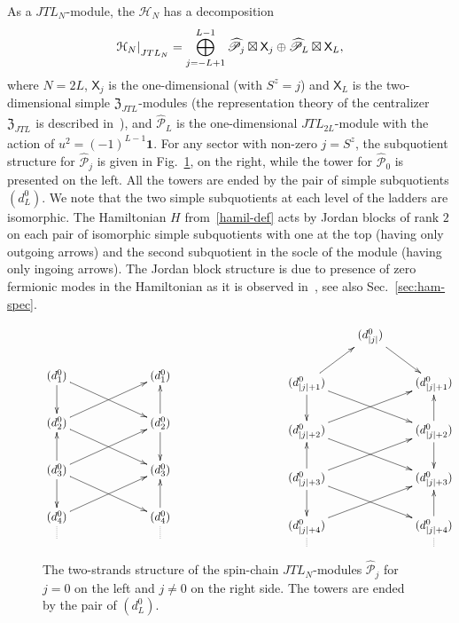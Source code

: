 \documentclass[11pt]{article}
\newcommand{\one}{\boldsymbol{1}}%
\newcommand{\JTL}[1]{JTL_{#1}}
\newcommand{\Hilb}{\mathcal{H}}
\newcommand{\cent}{\mathfrak{Z}}
\newcommand{\centJTL}{\cent_{\JTL{}}}
\newcommand{\Xodd}[1]{\mathsf{X}_{#1}}
\newcommand{\TLX}{d^0}
\newcommand{\APrTL}[1]{\widehat{\mathscr{P}}_{#1}}
\theoremstyle{definition}
\begin{document}
As a $\JTL{N}$-module, the $\Hilb_{N}$ has a decomposition
\begin{equation}\label{decomp-JTL}
\Hilb_N|_{\rule{0pt}{7.5pt}%
\JTL{N}} =  \bigoplus_{j=-L+1}^{L-1} \APrTL{j}\boxtimes\Xodd{j} \oplus
\APrTL{L}\boxtimes\Xodd{L},
\end{equation}
where $N=2L$, $\Xodd{j}$ is the one-dimensional (with $S^z=j$) and  $\Xodd{L}$ is the two-dimensional simple
$\centJTL$-modules (the representation theory of the centralizer $\centJTL$ is described
 in~\cite[Sec.~3]{GRS2}), and
 $\APrTL{L}$ is the one-dimensional $\JTL{2L}$-module with the action of $u^2=(-1)^{L-1}\one$.
 For any sector with non-zero  $j=S^z$,
the subquotient structure for $\APrTL{j}$ is given in
Fig.~\ref{FF-JTL-mod}, on the right, while the tower for $\APrTL{0}$
is presented on the left.  All the towers are ended by the pair of
simple subquotients $(\TLX_L)$.  We note that the
two simple subquotients at each level of the ladders are
isomorphic. The Hamiltonian $H$ from~\eqref{hamil-def} acts by Jordan
blocks of rank $2$ on each pair of isomorphic simple subquotients
with one at the top (having only outgoing arrows) and the second
subquotient in the socle of
the module (having only ingoing arrows). The Jordan block structure is due to presence of zero
fermionic modes in the Hamiltonian as it is observed in~\cite{GRS1},
see also Sec.~\ref{sec:ham-spec}.
 \begin{figure}\centering
\begin{equation*}
  \xymatrix@R=24pt@C=30pt{
    &{\mbox{}}&&\\
    {(\TLX_1)}\ar@[][d]\ar[drr]
    &&{(\TLX_1)}\\
    {(\TLX_2)}\ar@[][urr]\ar[drr]
    &&{(\TLX_2)}\ar[u]\ar@[][d]\\
    {(\TLX_3)}\ar[u]\ar@[][d]\ar@[][urr]\ar[drr]
    &&{(\TLX_3)}\\
    {(\TLX_4)}\ar@[][urr] \ar@{.}[]-<0pt,18pt>
    &&{(\TLX_4)}\ar[u]
    \ar@{.}[]-<0pt,18pt>}
\qquad\qquad\qquad
  \xymatrix@=22pt
  {{}&(\TLX_{|j|})\ar[dr]&&\\
    {(\TLX_{|j|+1})}\ar[ur]\ar@[][d]\ar[drr]
    &&{(\TLX_{|j|+1})}\\
    {(\TLX_{|j|+2})}\ar@[][urr]\ar[drr]
    &&{(\TLX_{|j|+2})}\ar[u]\ar@[][d]\\
    {(\TLX_{|j|+3})}\ar[u]\ar@[][d]\ar@[][urr]\ar[drr]
    &&{(\TLX_{|j|+3})}\\
    {(\TLX_{|j|+4})}\ar@[][urr] \ar@{.}[]-<0pt,18pt>
    &&{(\TLX_{|j|+4})}\ar[u]
    \ar@{.}[]-<0pt,18pt>}
\end{equation*}
      \caption{The two-strands structure of the spin-chain
      $\JTL{N}$-modules $\APrTL{j}$ for $j=0$ on the left and $j\ne0$
      on the right side. The towers are ended by the pair of
      $(\TLX_L)$.}
    \label{FF-JTL-mod}
    \end{figure}
\end{document}
